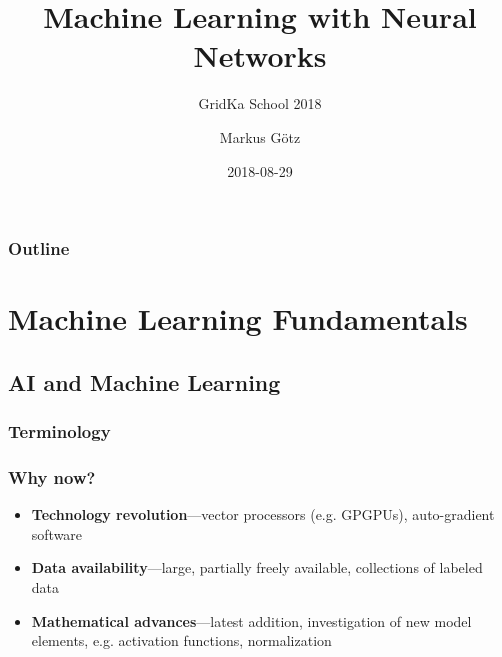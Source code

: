 \documentclass[aspectratio=169]{beamer}
\title{Machine Learning with Neural Networks}
\subtitle{GridKa School 2018}
\author{Markus Götz}
\date{2018-08-29}
\institute{KIT}
\begin{document}
\maketitle

\begin{frame}
\frametitle{Outline}
    \tableofcontents[hideallsubsections]
\end{frame}

\section{Machine Learning Fundamentals}
\label{sec:machine-learning}

\subsection{AI and Machine Learning}
\label{subsec:terminology}

\begin{frame}
    \frametitle{Terminology}
    
    \begin{figure}
        \centering
    \end{figure}
\end{frame}

\begin{frame}
\frametitle{Why now?}
    \begin{itemize}
        \item \textbf{Technology revolution}---vector processors (e.g. GPGPUs), auto-gradient software
        \item \textbf{Data availability}---large, partially freely available, collections of labeled data
        \item \textbf{Mathematical advances}---latest addition, investigation of new model elements, e.g. activation functions, normalization
    \end{itemize}
\end{frame}
\end{document}
